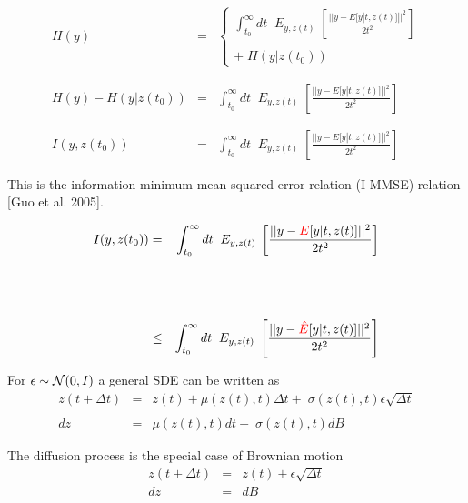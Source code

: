 {

{\huge
\begin{eqnarray*}
  H(y) & = & \left\{\begin{array}{l}\int_{t_0}^\infty dt \;\; E_{y,z(t)}\;\left[\frac{||y - E[y|t,z(t)]||^2}{2t^2}\right] \\ \\ +\;H(y|z(t_0))\end{array}\right. \\
  \\
  \\
  H(y) - H(y|z(t_0)) & = & \int_{t_0}^\infty dt \;\; E_{y,z(t)}\;\left[\frac{||y - E[y|t,z(t)]||^2}{2t^2}\right] \\
  \\
  \\
  I(y,z(t_0)) & = & \int_{t_0}^\infty dt \;\; E_{y,z(t)}\;\left[\frac{||y - E[y|t,z(t)]||^2}{2t^2}\right] 
\end{eqnarray*}

\vfill
This is the information minimum mean squared error relation (I-MMSE) relation [Guo et al. 2005].
}


{\huge
\begin{eqnarray*}
  I(y,z(t_0)) & = & \int_{t_0}^\infty dt \;\; E_{y,z(t)}\;\left[\frac{||y - {\color{red}E}[y|t,z(t)]||^2}{2t^2}\right]  \\
  \\
  \\
  \\
  & \leq & \int_{t_0}^\infty dt \;\; E_{y,z(t)}\;\left[\frac{||y - {\color{red}\hat{E}}[y|t,z(t)]||^2}{2t^2}\right]
\end{eqnarray*}
}


For $\epsilon \sim {\cal N}(0,I)$ a general SDE can be written as
\begin{eqnarray*}
z(t+\Delta t) & = & z(t) + \mu(z(t),t)\Delta t + \; \sigma(z(t),t)\epsilon\sqrt{\Delta t} \\
\\
dz & = & \mu(z(t),t)dt + \; \sigma(z(t),t)dB
\end{eqnarray*}

\vfill
The diffusion process is the special case of Brownian motion
\begin{eqnarray*}
z(t + \Delta t) & = & z(t) + \epsilon \sqrt{\Delta t} \\
dz & = & dB
\end{eqnarray*}

}
